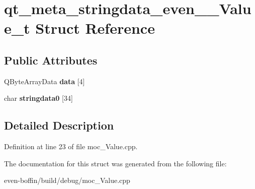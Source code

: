 \hypertarget{structqt__meta__stringdata__even_____value__t}{}\section{qt\+\_\+meta\+\_\+stringdata\+\_\+even\+\_\+\+\_\+\+Value\+\_\+t Struct Reference}
\label{structqt__meta__stringdata__even_____value__t}
\subsection*{Public Attributes}
\begin{DoxyCompactItemize}
\item 
\mbox{\label{structqt__meta__stringdata__even_____value__t_a19e92b2d22d4d3384ba9ce4ce9a9a61a}} 
Q\+Byte\+Array\+Data {\bfseries data} \mbox{[}4\mbox{]}
\item 
\mbox{\label{structqt__meta__stringdata__even_____value__t_a4e4e657ee13c9f1180e41699245484e3}} 
char {\bfseries stringdata0} \mbox{[}34\mbox{]}
\end{DoxyCompactItemize}


\subsection{Detailed Description}


Definition at line 23 of file moc\+\_\+\+Value.\+cpp.



The documentation for this struct was generated from the following file\+:\begin{DoxyCompactItemize}
\item 
even-\/boffin/build/debug/moc\+\_\+\+Value.\+cpp\end{DoxyCompactItemize}
